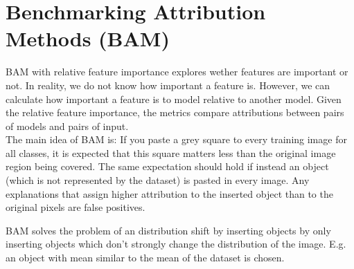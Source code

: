 \section{Benchmarking Attribution Methods (BAM) \cite{yang2019benchmarking}}

BAM with relative feature importance explores wether features are important or not. In reality, we do not know how important a feature is. However, we can calculate how important a feature is to model relative to another model. Given the relative feature importance, the metrics compare attributions between pairs of models and pairs of input.\\

The main idea of BAM is: If you paste a grey square to every training image for all classes, it is expected that this square matters less than the original image region being covered. The same expectation should hold if instead an object (which is not represented by the dataset) is pasted in every image. Any explanations that assign higher attribution to the inserted object than to the original pixels are false positives.

BAM solves the problem of an distribution shift by inserting objects by only inserting objects which don't strongly change the distribution of the image. E.g. an object with mean similar to the mean of the dataset is chosen.

